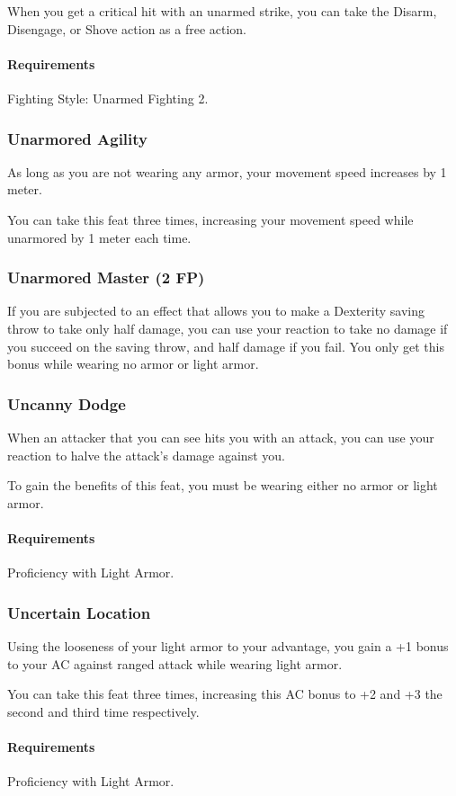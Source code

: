     When you get a critical hit with an unarmed strike, you can take the Disarm, Disengage, or Shove action as a free action.
    \paragraph{Requirements} Fighting Style: Unarmed Fighting 2.
\subsubsection{Unarmored Agility} \label{feat::unarmoredagility}
    As long as you are not wearing any armor, your movement speed increases by 1 meter.

    You can take this feat three times, increasing your movement speed while unarmored by 1 meter each time.
\subsubsection{Unarmored Master (2 FP)} \label{feat::unarmoredmaster}
    If you are subjected to an effect that allows you to make a Dexterity saving throw to take only half damage, you can use your reaction to take no damage if you succeed on the saving throw, and half damage if you fail.
    You only get this bonus while wearing no armor or light armor.
\subsubsection{Uncanny Dodge} \label{feat::uncannydodge}
    When an attacker that you can see hits you with an attack, you can use your reaction to halve the attack's damage against you.

    To gain the benefits of this feat, you must be wearing either no armor or light armor.
    \paragraph{Requirements} Proficiency with Light Armor.
\subsubsection{Uncertain Location} \label{feat::uncertainlocation}
    Using the looseness of your light armor to your advantage, you gain a +1 bonus to your AC against ranged attack while wearing light armor.

    You can take this feat three times, increasing this AC bonus to +2 and +3 the second and third time respectively.
    \paragraph{Requirements} Proficiency with Light Armor.
